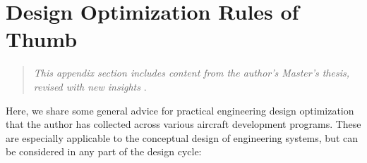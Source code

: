 \chapter{Design Optimization Rules of Thumb}

\begin{quote}
    \emph{This appendix section includes content from the author's Master's thesis, revised with new insights} \cite{sharpe_aerosandbox_2021}.
\end{quote}

Here, we share some general advice for practical engineering design optimization that the author has collected across various aircraft development programs. These are especially applicable to the conceptual design of engineering systems, but can be considered in any part of the design cycle:

